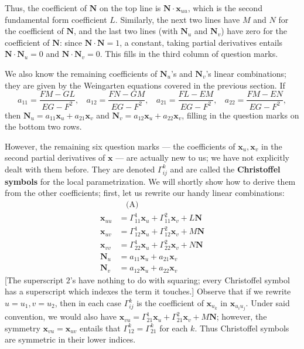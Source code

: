 \documentclass[leqno]{book}
\begin{document}
Thus, the coefficient of $\mathbf N$ on the top line is $\mathbf N\cdot\mathbf x_{uu}$, which is the second fundamental form coefficient $L$.  Similarly, the next two lines have $M$ and $N$ for the coefficient of $\mathbf N$, and the last two lines (with $\mathbf N_u$ and $\mathbf N_v$) have zero for the coefficient of $\mathbf N$: since $\mathbf N\cdot\mathbf N=1$, a constant, taking partial derivatives entails $\mathbf N\cdot\mathbf N_u=0$ and $\mathbf N\cdot\mathbf N_v=0$.  This fills in the third column of question marks.

We also know the remaining coefficients of $\mathbf N_u$'s and $\mathbf N_v$'s linear combinations; they are given by the Weingarten equations covered in the previous section.  If
$$a_{11}=\frac{FM-GL}{EG-F^2},~~~~a_{12}=\frac{FN-GM}{EG-F^2},~~~~a_{21}=\frac{FL-EM}{EG-F^2},~~~~a_{22}=\frac{FM-EN}{EG-F^2},$$
then $\mathbf N_u=a_{11}\mathbf x_u+a_{21}\mathbf x_v$ and $\mathbf N_v=a_{12}\mathbf x_u+a_{22}\mathbf x_v$, filling in the question marks on the bottom two rows.

However, the remaining six question marks \---- the coefficients of $\mathbf x_u,\mathbf x_v$ in the second partial derivatives of $\mathbf x$ \---- are actually new to us; we have not explicitly dealt with them before.  They are denoted $\Gamma_{ij}^k$ and are called the \textbf{Christoffel symbols} for the local parametrization.  We will shortly show how to derive them from the other coefficients; first, let us rewrite our handy linear combinations:
\begin{align*}
&~~~~\text{(A)}\\
\mathbf x_{uu}&=\Gamma_{11}^1\mathbf x_u+\Gamma_{11}^2\mathbf x_v+L\mathbf N\\
\mathbf x_{uv}&=\Gamma_{12}^1\mathbf x_u+\Gamma_{12}^2\mathbf x_v+M\mathbf N\\
\mathbf x_{vv}&=\Gamma_{22}^1\mathbf x_u+\Gamma_{22}^2\mathbf x_v+N\mathbf N\\
\mathbf N_u&=a_{11}\mathbf x_u+a_{21}\mathbf x_v\\
\mathbf N_v&=a_{12}\mathbf x_u+a_{22}\mathbf x_v
\end{align*}
[The superscript $2$'s have nothing to do with squaring; every Christoffel symbol has a superscript which indexes the term it touches.]  Observe that if we rewrite $u=u_1,v=u_2$, then in each case $\Gamma_{ij}^k$ is the coefficient of $\mathbf x_{u_k}$ in $\mathbf x_{u_iu_j}$.  Under said convention, we would also have $\mathbf x_{vu}=\Gamma_{21}^1\mathbf x_u+\Gamma_{21}^2\mathbf x_v+M\mathbf N$; however, the symmetry $\mathbf x_{vu}=\mathbf x_{uv}$ entails that $\Gamma_{12}^k=\Gamma_{21}^k$ for each $k$.  Thus Christoffel symbols are symmetric in their lower indices.
\end{document}
